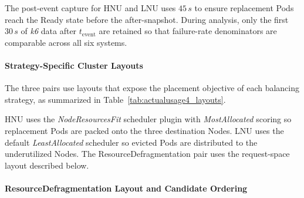 The post-event capture for HNU and LNU uses \(45\,s\) to ensure replacement Pods reach the Ready state before the after-snapshot. During analysis, only the first \(30\,s\) of \textit{k6} data after \(t_{\text{event}}\) are retained so that failure-rate denominators are comparable across all six systems.

\paragraph{Strategy-Specific Cluster Layouts}
\label{subsubsec:actualusage4_layouts}

The three pairs use layouts that expose the placement objective of each balancing strategy, as summarized in Table~\ref{tab:actualusage4_layouts}.

\begin{table}[tbp]
    \centering
    \caption{Strategy-Specific Layouts for Actual Usage Evaluation}
    \label{tab:actualusage4_layouts}
    \renewcommand{\arraystretch}{1.2}
\end{table}

HNU uses the \textit{NodeResourcesFit} scheduler plugin with \textit{MostAllocated} scoring so replacement Pods are packed onto the three destination Nodes. LNU uses the default \textit{LeastAllocated} scheduler so evicted Pods are distributed to the underutilized Nodes. The ResourceDefragmentation pair uses the request-space layout described below.

\paragraph{ResourceDefragmentation Layout and Candidate Ordering}
\label{subsubsec:actualusage4_candidateordering}

